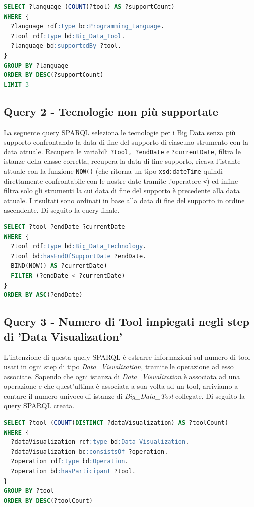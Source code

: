 \begin{lstlisting}[language=SQL]
SELECT ?language (COUNT(?tool) AS ?supportCount)
WHERE {
  ?language rdf:type bd:Programming_Language.
  ?tool rdf:type bd:Big_Data_Tool.  
  ?language bd:supportedBy ?tool.
}
GROUP BY ?language
ORDER BY DESC(?supportCount)
LIMIT 3
\end{lstlisting}


\subsection{Query 2 - Tecnologie non più supportate}
La seguente query SPARQL seleziona le tecnologie per i Big Data senza più supporto confrontando la data di fine del supporto di ciascuno strumento con la data attuale. Recupera le variabili \texttt{?tool, ?endDate} e \texttt{?currentDate}, filtra le istanze della classe corretta, recupera la data di fine supporto, ricava l'istante attuale con la funzione \texttt{NOW()} (che ritorna un tipo \texttt{xsd:dateTime} quindi direttamente confrontabile con le nostre date tramite l'operatore \texttt{<}) ed infine filtra solo gli strumenti la cui data di fine del supporto è precedente alla data attuale. I risultati sono ordinati in base alla data di fine del supporto in ordine ascendente. Di seguito la query finale.\\
\newpage
\begin{lstlisting}[language=SQL]
SELECT ?tool ?endDate ?currentDate
WHERE {
  ?tool rdf:type bd:Big_Data_Technology.
  ?tool bd:hasEndOfSupportDate ?endDate.
  BIND(NOW() AS ?currentDate)
  FILTER (?endDate < ?currentDate)
}
ORDER BY ASC(?endDate)
\end{lstlisting}
\subsection{Query 3 - Numero di Tool impiegati negli step di 'Data Visualization'}
L'intenzione di questa query SPARQL è estrarre informazioni sul numero di tool usati in ogni step di tipo \textit{Data\_Visualization}, tramite le operazione ad esso associate. Sapendo che ogni istanza di \textit{Data\_Visualization} è associata ad una operazione e che quest'ultima è associata a sua volta ad un tool, arriviamo a contare il numero univoco di istanze di \textit{Big\_Data\_Tool} collegate. Di seguito la query SPARQL creata.\\

\begin{lstlisting}[language=SQL]
SELECT ?tool (COUNT(DISTINCT ?dataVisualization) AS ?toolCount)
WHERE {
  ?dataVisualization rdf:type bd:Data_Visualization.
  ?dataVisualization bd:consistsOf ?operation.
  ?operation rdf:type bd:Operation.
  ?operation bd:hasParticipant ?tool.
}
GROUP BY ?tool
ORDER BY DESC(?toolCount)
\end{lstlisting}
\newpage
